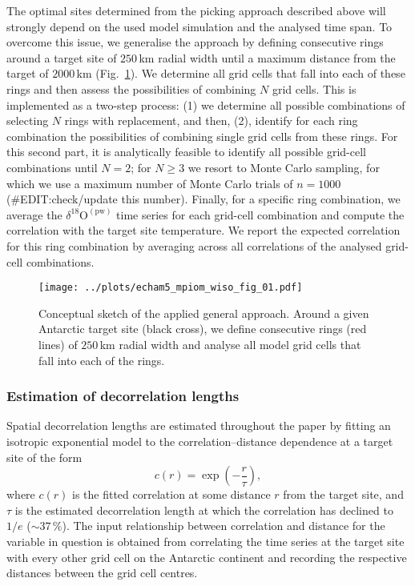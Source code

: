 \documentclass[cp, manuscript]{copernicus}
\begin{document}
The optimal sites determined from the picking approach described above will
strongly depend on the used model simulation and the analysed time span. To
overcome this issue, we generalise the approach by defining consecutive rings
around a target site of $250$\,km radial width until a maximum distance from the
target of $2000$\,km (Fig.~\ref{fig:concept}). We determine all grid cells that fall into
each of these rings and then assess the possibilities of combining $N$ grid
cells. This is implemented as a two-step process: (1) we determine all possible
combinations of selecting $N$ rings with replacement, and then, (2), identify
for each ring combination the possibilities of combining single grid cells from
these rings. For this second part, it is analytically feasible to identify all
possible grid-cell combinations until $N=2$; for $N\geq3$ we resort to Monte
Carlo sampling, for which we use a maximum number of Monte Carlo trials of
$n=1000$ (\#EDIT:check/update this number). Finally, for a specific ring
combination, we average the $\delta^{18}\mathrm{O}^{\mathrm{(pw)}}$ time series
for each grid-cell combination and compute the correlation with the target
site temperature. We report the expected correlation for this ring combination
by averaging across all correlations of the analysed grid-cell combinations.

\begin{figure}[t]%
\centering
\texttt{[image: ../plots/echam5\_mpiom\_wiso\_fig\_01.pdf]}
\caption[Conceptual approach]{%
  Conceptual sketch of the applied general approach. Around a given Antarctic
  target site (black cross), we define consecutive rings (red lines) of
  $250$\,km radial width and analyse all model grid cells that fall into each of
  the rings.}
\label{fig:concept}%
\end{figure}%

\subsubsection{Estimation of decorrelation lengths}\label{methods:decor.model}

Spatial decorrelation lengths are estimated throughout the paper by fitting an
isotropic exponential model to the correlation--distance dependence at a target
site of the form
\begin{equation}\label{eq:decor.model}
c(r) = \exp{\left(-\frac{r}{\tau}\right)},
\end{equation}
where $c(r)$ is the fitted correlation at some distance $r$ from the target
site, and $\tau$ is the estimated decorrelation length at which the correlation
has declined to $1/e$ ($\sim37\,\%$). The input relationship between correlation
and distance for the variable in question is obtained from correlating the time
series at the target site with every other grid cell on the Antarctic continent
and recording the respective distances between the grid cell
centres.
\end{document}
